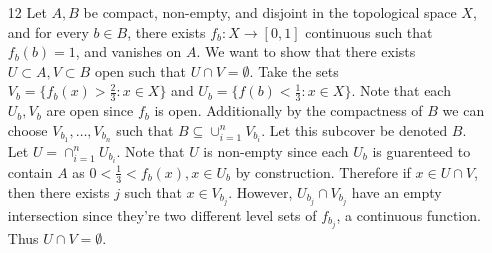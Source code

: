 \documentclass[12pt, letterpaper]{article}
\begin{document}
\begin{enumerate}
\begin{enumerate}
	\end{enumerate}
	\item[12] Let $A,B$ be compact, non-empty, and disjoint in the topological space $X$, and for every $b \in B$, there exists $f_b : X \to [0,1]$ continuous such that
	$f_b(b) = 1$, and vanishes on $A$.  We want to show that there exists $U \subset A,
	V \subset B$ open such that $U \cap V = \emptyset$.  Take the sets $V_b = 
	\{f_b(x) > \frac{2}{3}: x \in X\}$ and $U_b = \{f(b) < \frac{1}{3}: x \in X\}$.  
	Note that each $U_b, V_b$ are open since $f_b$ is open.  Additionally by the 
	compactness of $B$ we can choose $V_{b_1},\ldots,V_{b_n}$ such that 
	$B \subseteq \cup_{i=1}^n V_{b_i}$.  Let this subcover be denoted $B$.  Let 
	$U = \cap_{i=1}^n U_{b_i}$.  Note that $U$ is non-empty since each $U_b$ is 
	guarenteed to contain $A$ as $0 < \frac{1}{3} < f_b(x), x \in U_b$ by construction.
	Therefore if $x \in U \cap V$, then there exists $j$ such that 
	$x \in V_{b_j}$.  However, $U_{b_j} \cap V_{b_j}$ have an empty intersection 
	since they're two different level sets of $f_{b_j}$, a continuous function.  
	Thus $U \cap V = \emptyset$.    
\end{enumerate}
\end{document}
